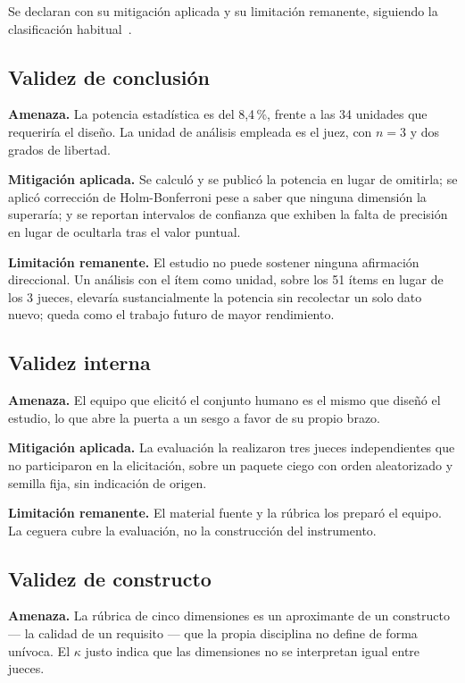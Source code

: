 \documentclass[11pt,a4paper]{article}
\begin{document}
Se declaran con su mitigaci\'on aplicada y su limitaci\'on remanente, siguiendo la
clasificaci\'on habitual~\cite{wohlin2012experimentation,runeson2009guidelines}.

\subsection{Validez de conclusi\'on}

\textbf{Amenaza.} La potencia estad\'istica es del 8,4\,\%, frente a las 34 unidades que
requerir\'ia el dise\~no. La unidad de an\'alisis empleada es el juez, con $n = 3$ y dos
grados de libertad.

\textbf{Mitigaci\'on aplicada.} Se calcul\'o y se public\'o la potencia en lugar de
omitirla; se aplic\'o correcci\'on de Holm-Bonferroni pese a saber que ninguna
dimensi\'on la superar\'ia; y se reportan intervalos de confianza que exhiben la falta
de precisi\'on en lugar de ocultarla tras el valor puntual.

\textbf{Limitaci\'on remanente.} El estudio no puede sostener ninguna afirmaci\'on
direccional. Un an\'alisis con el \'item como unidad, sobre los 51 \'items en lugar de
los 3 jueces, elevar\'ia sustancialmente la potencia sin recolectar un solo dato nuevo;
queda como el trabajo futuro de mayor rendimiento.

\subsection{Validez interna}

\textbf{Amenaza.} El equipo que elicit\'o el conjunto humano es el mismo que dise\~n\'o
el estudio, lo que abre la puerta a un sesgo a favor de su propio brazo.

\textbf{Mitigaci\'on aplicada.} La evaluaci\'on la realizaron tres jueces independientes
que no participaron en la elicitaci\'on, sobre un paquete ciego con orden aleatorizado
y semilla fija, sin indicaci\'on de origen.

\textbf{Limitaci\'on remanente.} El material fuente y la r\'ubrica los prepar\'o el
equipo. La ceguera cubre la evaluaci\'on, no la construcci\'on del instrumento.

\subsection{Validez de constructo}

\textbf{Amenaza.} La r\'ubrica de cinco dimensiones es un aproximante de un constructo
--- la calidad de un requisito --- que la propia disciplina no define de forma
un\'ivoca. El $\kappa$ justo indica que las dimensiones no se interpretan igual entre
jueces.
\end{document}
